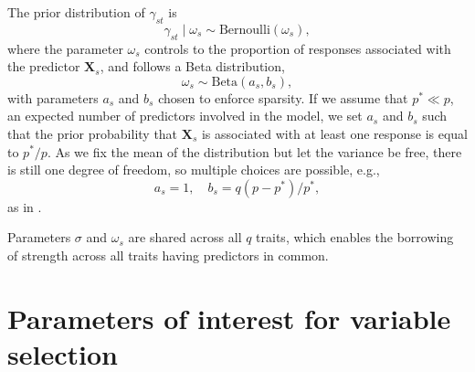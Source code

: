 \documentclass[a4paper, 11pt]{report}
\numberwithin{equation}{chapter}
\begin{document}
The prior distribution of $\gamma_{st}$ is
\begin{equation*}
\gamma_{st} \mid \omega_s \sim  \text{Bernoulli}(\omega_s),
\end{equation*}
where the parameter $\omega_s$ controls to the proportion of responses associated with the predictor $\boldsymbol{X}_s$, and follows a Beta distribution,
\begin{equation*}
\omega_s \sim \text{Beta}(a_s, b_s),
\end{equation*}
with parameters $a_s$ and $b_s$ chosen to enforce sparsity. If we assume that $p^* \ll p$, an expected number of predictors involved in the model, we set $a_s$ and $b_s$ such that the prior probability that $\boldsymbol{X}_s$ is associated with at least one response is equal to $p^*/p$. As we fix the mean of the distribution but let the variance be free, there is still one degree of freedom, so multiple choices are possible, e.g.,
\begin{equation*}
a_s = 1,\quad b_s = q(p-p^*)/p^*,
\end{equation*}
 as in \citet{bay_lin}.

Parameters $\sigma$ and $\omega_s$ are shared across all $q$ traits, which enables the borrowing of strength across all traits having predictors in common. 

\section{Parameters of interest for variable selection}
\end{document}
